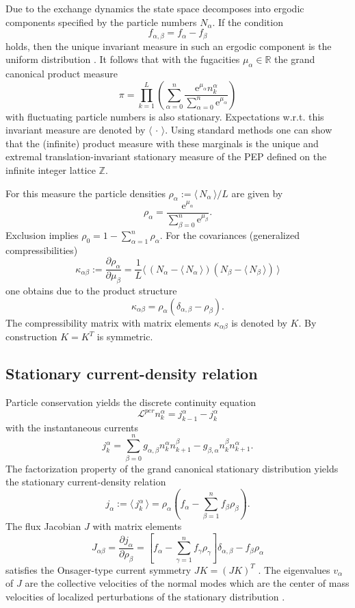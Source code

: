 \documentclass[12pt]{article}
\newcommand{\be}{\begin{equation}}
\newcommand{\bel}[1]{\begin{equation}\label{#1}}
\newcommand{\ee}{\end{equation}}
\newcommand{\exval}[1]{\mbox{$\langle \, {#1}\, \rangle$}}
\newcommand{\rme}{\mathrm{e}}
\newcommand{\R}{{\mathbb R}}
\newcommand{\Z}{{\mathbb Z}}
\begin{document}
Due to the exchange dynamics the state space decomposes into 
ergodic components specified by the particle numbers $N_\alpha$.
If the condition
\bel{stat}
f_{\alpha,\beta} = f_\alpha - f_\beta
\ee
holds, then the unique invariant measure in such an ergodic
component is the
uniform distribution \cite{Schu17}.
It follows that with the fugacities $\mu_\alpha\in\R$ the grand canonical product measure
\begin{equation}
\pi = \prod_{k=1}^{L} \left(\sum_{\alpha=0}^n \frac{\rme^{\mu_\alpha} n_k^{\alpha}}{\sum_{\alpha=0}^n \rme^{\mu_\alpha}} \right)
\label{invmeas}
\end{equation}
with fluctuating particle numbers is also stationary. 
Expectations w.r.t. this invariant measure are denoted by
$\exval{\cdot}$. Using standard methods \cite{Ligg99} one can show that
the (infinite) product measure with these marginals is the
unique and extremal translation-invariant stationary measure
of the PEP defined on the infinite integer lattice $\Z$.

For this measure the particle densities $\rho_\alpha := \exval{N_{\alpha}}/L $ are given by
\be
\rho_\alpha
= \frac{\rme^{\mu_\alpha} }{ \sum_{\beta=0}^n \rme^{\mu_{\beta}}}.
\ee
Exclusion implies $\rho_0 = 1 - \sum_{\alpha=1}^n \rho_\alpha$.
For the covariances (generalized compressibilities)
\be
\kappa_{\alpha \beta} := \frac{\partial \rho_\alpha}{\partial \mu_\beta} =
\frac{1}{L} \exval{(N_{\alpha}-\exval{N_{\alpha}})(N_{\beta}-\exval{N_{\beta}})} 
\ee
one obtains due to the product structure
\be
\kappa_{\alpha \beta} = \rho_\alpha 
(\delta_{\alpha,\beta}-\rho_\beta).
\ee
The compressibility
matrix with matrix elements $\kappa_{\alpha\beta}$ is denoted by $K$. By construction $K=K^T$ is symmetric.


\subsection{Stationary current-density relation}

Particle conservation yields the discrete continuity equation
\begin{equation}
\mathcal{L}^{per} n^\alpha_{k} = j_{k-1}^\alpha - j_k^\alpha
\label{cebulk}
\end{equation}
with the instantaneous currents 
\be
 j_k^\alpha = \sum_{\beta=0}^n g_{\alpha,\beta} n_k^\alpha n_{k+1}^\beta - g_{\beta,\alpha} n_k^\beta n_{k+1}^\alpha.
\label{instcurr}
\ee
The  factorization property of the
grand canonical stationary distribution yields the stationary current-density relation
\bel{statcur}
j_\alpha := \exval{ j_k^\alpha} = \rho_\alpha 
\left(f_\alpha- \sum_{\beta=1}^n f_\beta \rho_\beta\right).
\ee
The flux Jacobian $J$ with matrix elements
\bel{velmat}
J_{\alpha\beta} = \frac{\partial j_\alpha}{\partial \rho_\beta} = 
\left[ f_\alpha  - \sum_{\gamma=1}^n f_{\gamma} \rho_\gamma\right]  \delta_{\alpha,\beta}-  f_\beta \rho_\alpha
\ee
satisfies the Onsager-type current symmetry $JK = (JK)^T$ \cite{Toth03,Gris11}. The eigenvalues $v_\alpha$ of $J$ 
are the collective velocities of the normal modes
which are the center of mass velocities of localized
perturbations of the stationary distribution \cite{Schu03}.
\end{document}
